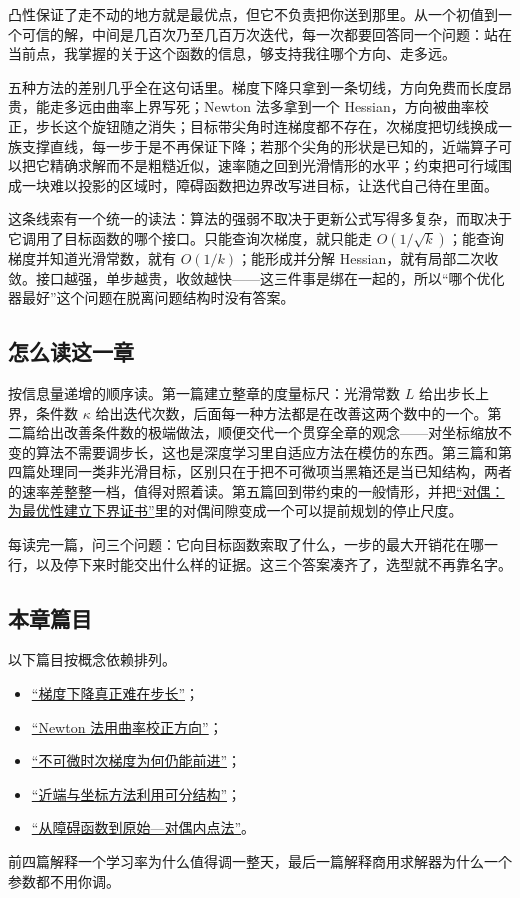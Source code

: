 凸性保证了走不动的地方就是最优点，但它不负责把你送到那里。从一个初值到一个可信的解，中间是几百次乃至几百万次迭代，每一次都要回答同一个问题：站在当前点，我掌握的关于这个函数的信息，够支持我往哪个方向、走多远。

五种方法的差别几乎全在这句话里。梯度下降只拿到一条切线，方向免费而长度昂贵，能走多远由曲率上界写死；Newton 法多拿到一个 Hessian，方向被曲率校正，步长这个旋钮随之消失；目标带尖角时连梯度都不存在，次梯度把切线换成一族支撑直线，每一步于是不再保证下降；若那个尖角的形状是已知的，近端算子可以把它精确求解而不是粗糙近似，速率随之回到光滑情形的水平；约束把可行域围成一块难以投影的区域时，障碍函数把边界改写进目标，让迭代自己待在里面。

这条线索有一个统一的读法：算法的强弱不取决于更新公式写得多复杂，而取决于它调用了目标函数的哪个接口。只能查询次梯度，就只能走 \(O(1/\sqrt k)\)；能查询梯度并知道光滑常数，就有 \(O(1/k)\)；能形成并分解 Hessian，就有局部二次收敛。接口越强，单步越贵，收敛越快——这三件事是绑在一起的，所以``哪个优化器最好''这个问题在脱离问题结构时没有答案。

\subsection{怎么读这一章}

按信息量递增的顺序读。第一篇建立整章的度量标尺：光滑常数 \(L\) 给出步长上界，条件数 \(\kappa\) 给出迭代次数，后面每一种方法都是在改善这两个数中的一个。第二篇给出改善条件数的极端做法，顺便交代一个贯穿全章的观念——对坐标缩放不变的算法不需要调步长，这也是深度学习里自适应方法在模仿的东西。第三篇和第四篇处理同一类非光滑目标，区别只在于把不可微项当黑箱还是当已知结构，两者的速率差整整一档，值得对照着读。第五篇回到带约束的一般情形，并把\hyperref[ch:075]{``对偶：为最优性建立下界证书''}里的对偶间隙变成一个可以提前规划的停止尺度。

每读完一篇，问三个问题：它向目标函数索取了什么，一步的最大开销花在哪一行，以及停下来时能交出什么样的证据。这三个答案凑齐了，选型就不再靠名字。

\subsection{本章篇目}

以下篇目按概念依赖排列。

\begin{itemize}
\tightlist
\item \hyperref[sec:09-Convex-Optimization/06-Optimization-Algorithms/01]{``梯度下降真正难在步长''}；
\item \hyperref[sec:09-Convex-Optimization/06-Optimization-Algorithms/02]{``Newton 法用曲率校正方向''}；
\item \hyperref[sec:09-Convex-Optimization/06-Optimization-Algorithms/03]{``不可微时次梯度为何仍能前进''}；
\item \hyperref[sec:09-Convex-Optimization/06-Optimization-Algorithms/04]{``近端与坐标方法利用可分结构''}；
\item \hyperref[sec:09-Convex-Optimization/06-Optimization-Algorithms/05]{``从障碍函数到原始---对偶内点法''}。
\end{itemize}

前四篇解释一个学习率为什么值得调一整天，最后一篇解释商用求解器为什么一个参数都不用你调。

